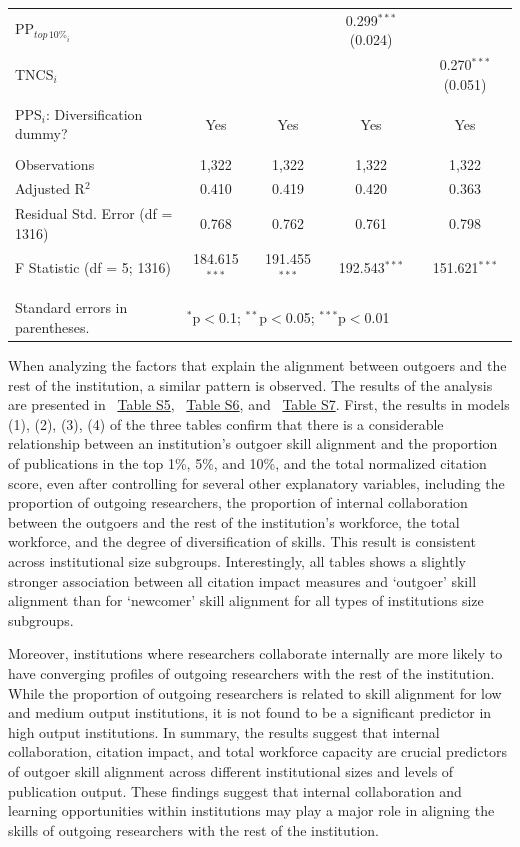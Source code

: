 \documentclass[draft,final]{vutinfth} %
\begin{document}
\begin{table}
\begin{tabularx}{\textwidth}{@{\extracolsep{\fill}}lcccc}
  PP$_{{top\,10\%}_{i}}$ &  &  & 0.299$^{***}$ (0.024) &  \\ 
  TNCS$_{i}$ &  &  &  & 0.270$^{***}$ (0.051) \\ 
 \hline \\[-1.8ex] 
PPS$_{i}$: Diversification dummy? & Yes & Yes & Yes & Yes \\ 
\hline \\[-1.8ex] 
Observations & 1,322 & 1,322 & 1,322 & 1,322 \\ 
Adjusted R$^{2}$ & 0.410 & 0.419 & 0.420 & 0.363 \\ 
Residual Std. Error (df = 1316) & 0.768 & 0.762 & 0.761 & 0.798 \\ 
F Statistic (df = 5; 1316) & 184.615$^{***}$ & 191.455$^{***}$ & 192.543$^{***}$ & 151.621$^{***}$ \\ 
\hline 
\hline \\[-1.8ex] 
Standard errors in parentheses. & \multicolumn{4}{l}{$^{*}$p$<$0.1; $^{**}$p$<$0.05; $^{***}$p$<$0.01} \\ 
\end{tabularx} 
\end{table} 

When analyzing the factors that explain the alignment between outgoers and the rest of the institution, a similar pattern is observed. The results of the analysis are presented in ~\hyperref[Table S5]{Table S5}, ~\hyperref[Table S6]{Table S6}, and ~\hyperref[Table S7]{Table S7}. First, the results in models (1), (2), (3), (4) of the three tables confirm that there is a considerable relationship between an institution's outgoer skill alignment and the proportion of publications in the top 1\%, 5\%, and 10\%, and the total normalized citation score, even after controlling for several other explanatory variables, including the proportion of outgoing researchers, the proportion of internal collaboration between the outgoers and the rest of the institution's workforce, the total workforce, and the degree of diversification of skills. This result is consistent across institutional size subgroups. Interestingly, all tables shows a slightly stronger association between all citation impact measures and `outgoer' skill alignment than for `newcomer' skill alignment for all types of institutions size subgroups. 

Moreover, institutions where researchers collaborate internally are more likely to have converging profiles of outgoing researchers with the rest of the institution. While the proportion of outgoing researchers is related to skill alignment for low and medium output institutions, it is not found to be a significant predictor in high output institutions. In summary, the results suggest that internal collaboration, citation impact, and total workforce capacity are crucial predictors of outgoer skill alignment across different institutional sizes and levels of publication output. These findings suggest that internal collaboration and learning opportunities within institutions may play a major role in aligning the skills of outgoing researchers with the rest of the institution.
\end{document}
